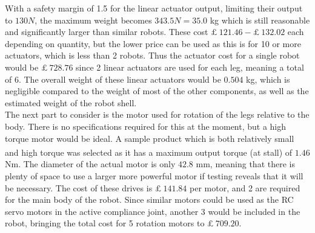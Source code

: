 \documentclass[11pt]{article}		%
\begin{document}
		With a safety margin of 1.5 for the linear actuator output, limiting their output to $130 N$, the maximum weight becomes $343.5 N = 35.0$ kg which is still reasonable and significantly larger than similar robots.
		These cost $£ \ 121.46 - £ \ 132.02$ each depending on quantity, but the lower price can be used as this is for 10 or more actuators, which is less than 2 robots. 
		Thus the actuator cost for a single robot would be $£ \ 728.76$ since 2 linear actuators are used for each leg, meaning a total of 6.
		The overall weight of these linear actuators would be $0.504$ kg, which is negligible compared to the weight of most of the other components, as well as the estimated weight of the robot shell.
		\\
		The next part to consider is the motor used for rotation of the legs relative to the body. There is no specifications required for this at the moment, but a high torque motor would be ideal.
		A sample product which is both relatively small and high torque was selected\textsuperscript{\cite{rsproRotation}} as it has a maximum output torque (at stall) of $1.46$ Nm.
		The diameter of the actual motor is only $42.8$ mm, meaning that there is plenty of space to use a larger more powerful motor if testing reveals that it will be necessary.
		The cost of these drives is $£ \ 141.84$ per motor, and 2 are required for the main body of the robot.
		Since similar motors could be used as the RC servo motors in the active compliance joint, another 3 would be included in the robot, bringing the total cost for 5 rotation motors to $£ \ 709.20$.
		\\
\end{document}
